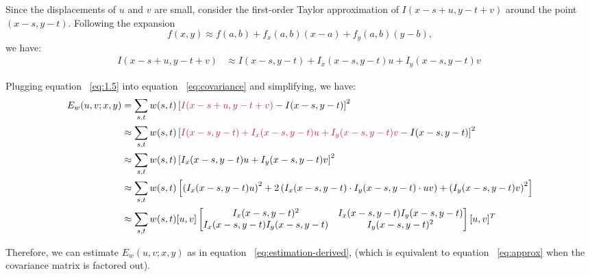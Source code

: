 \begin{Answer}
  Since the displacements of $u$ and $v$ are small,
  consider the first-order Taylor approximation of $I(x-s+u,y-t+v)$ around the point $(x-s, y-t)$.
  Following the expansion
  \[ f(x,y) \approx f(a,b) + f_x(a,b)(x-a) + f_y(a,b)(y-b), \]
  we have:
  \begin{align}
    I(x-s+u,y-t+v) &\approx I(x-s,y-t) + I_x(x-s,y-t)u + I_y(x-s,y-t)v ~\label{eq:1.5}
  \end{align}

  \step
  Plugging equation ~\eqref{eq:1.5} into equation ~\eqref{eq:covariance} and simplifying,
  we have:
  \begin{align}
    E_w(u,v;x,y) &= \sum_{s,t} w(s,t) \left[\crim{I(x-s+u,y-t+v)} - I(x-s,y-t)\right]^2 \nonumber \\
    &\approx \sum_{s,t} w(s,t) \left[\crim{I(x-s,y-t) + I_x(x-s,y-t)u + I_y(x-s,y-t)v} - I(x-s,y-t)\right]^2 \nonumber \\
    &\approx \sum_{s,t} w(s,t) \left[I_x(x-s,y-t)u + I_y(x-s,y-t)v\right]^2 \nonumber \\
    &\approx \sum_{s,t} w(s,t) \left[\left(I_x(x-s,y-t)u\right)^2 + 2\left(I_x(x-s,y-t) \cdot I_y(x-s,y-t) \cdot uv\right) + \left(I_y(x-s,y-t)v\right)^2\right] \nonumber \\
    &\approx \sum_{s,t} w(s,t) [u, v]
      \begin{bmatrix}
        I_x(x-s,y-t)^2 & I_x(x-s,y-t)I_y(x-s,y-t) \\
        I_x(x-s,y-t)I_y(x-s,y-t) & I_y(x-s,y-t)^2
      \end{bmatrix}
    [u, v]^T ~\label{eq:estimation-derived}
  \end{align}

  \step
  Therefore, we can estimate $E_w(u,v; x, y)$ as in equation ~\eqref{eq:estimation-derived},
  (which is equivalent to equation ~\ref{eq:approx} when the covariance matrix
  is factored out).
\end{Answer}
